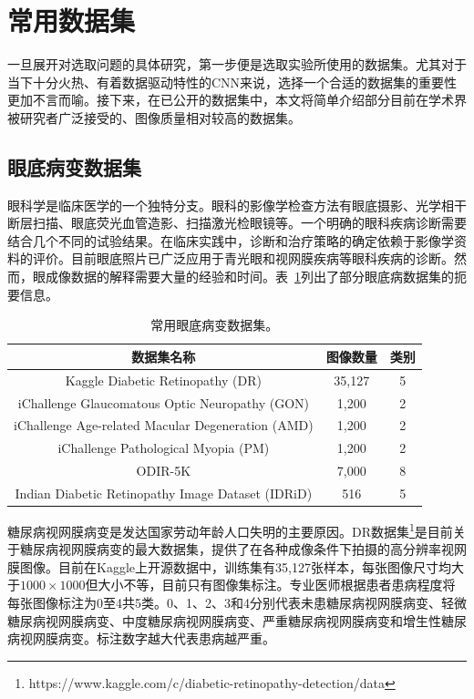 \section{常用数据集}\label{sec:usually_ds_intro}
一旦展开对选取问题的具体研究，第一步便是选取实验所使用的数据集。尤其对于当下十分火热、有着数据驱动特性的CNN来说，选择一个合适的数据集的重要性更加不言而喻。接下来，在已公开的数据集中，本文将简单介绍部分目前在学术界被研究者广泛接受的、图像质量相对较高的数据集。

\subsection{眼底病变数据集}\label{subsec:original_dr_dataset_intro}
眼科学是临床医学的一个独特分支。眼科的影像学检查方法有眼底摄影、光学相干断层扫描、眼底荧光血管造影、扫描激光检眼镜等。一个明确的眼科疾病诊断需要结合几个不同的试验结果。在临床实践中，诊断和治疗策略的确定依赖于影像学资料的评价。目前眼底照片已广泛应用于青光眼和视网膜疾病等眼科疾病的诊断。然而，眼成像数据的解释需要大量的经验和时间。表~\ref{tab:datasets_info}列出了部分眼底病数据集的扼要信息。
\begin{table}[h]
	\centering
	\caption[常用眼底病变数据集]{常用眼底病变数据集。}
	\label{tab:datasets_info}
	\begin{tabular}{c|c|c}
		\toprule[2pt]
		数据集名称 & 图像数量 & 类别 \\
		\midrule[2pt]
		Kaggle Diabetic Retinopathy (DR)	& 35,127	& 5	 \\
		\hline                         
		iChallenge Glaucomatous Optic Neuropathy (GON)    & 1,200    & 2 \\ \hline
		iChallenge Age-related Macular Degeneration (AMD) & 1,200    & 2  \\ \hline
		iChallenge Pathological Myopia (PM)               & 1,200    & 2 \\ \hline
		ODIR-5K & 7,000 & 8 \\ \hline
		
		Indian Diabetic Retinopathy Image Dataset (IDRiD) & 516 & 5  \\
		\bottomrule[2pt]
	\end{tabular}
\end{table}

糖尿病视网膜病变是发达国家劳动年龄人口失明的主要原因。DR数据集\footnote{https://www.kaggle.com/c/diabetic-retinopathy-detection/data}是目前关于糖尿病视网膜病变的最大数据集，提供了在各种成像条件下拍摄的高分辨率视网膜图像。目前在Kaggle上开源数据中，训练集有35,127张样本，每张图像尺寸均大于$1000\times 1000$但大小不等，目前只有图像集标注。专业医师根据患者患病程度将每张图像标注为0至4共5类。0、1、2、3和4分别代表未患糖尿病视网膜病变、轻微糖尿病视网膜病变、中度糖尿病视网膜病变、严重糖尿病视网膜病变和增生性糖尿病视网膜病变。标注数字越大代表患病越严重。


